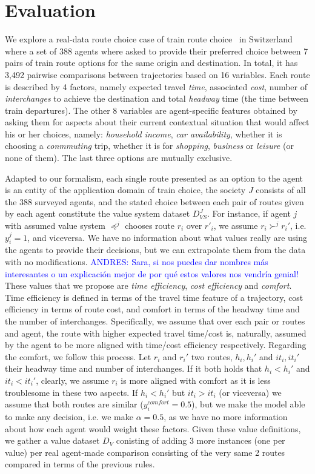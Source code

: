 \documentclass{ecai}
\begin{document}
\section{Evaluation}\label{sec:evaluation}
We explore a real-data route choice case of train route choice~\cite{apollochoicepublication} in Switzerland where a set of 388 agents where asked to provide their preferred choice between 7 pairs of train route options for the same origin and destination. In total, it has 3,492 pairwise comparisons between trajectories based on 16 variables. Each route is described by 4 factors, namely expected travel \textit{time}, associated \textit{cost}, number of \textit{interchanges} to achieve the destination and total \textit{headway} time (the time between train departures). The other 8 variables are agent-specific features obtained by asking them for aspects about their current contextual situation that would affect his or her choices, namely: \textit{household income}, \textit{car availability}, whether it is choosing a \textit{conmmuting} trip, whether it is for \textit{shopping}, \textit{business} or \textit{leisure} (or none of them). The last three options are mutually exclusive. 

Adapted to our formalism, each single route presented as an option to the agent is an entity of the application domain of train choice, the society $J$ consists of all the 388 surveyed agents, and the stated choice between each pair of routes given by each agent constitute the value system dataset $D_{VS}^J$. For instance, if agent $j$ with assumed value system $\preccurlyeq^j$ chooses route $r_i$ over $r'_i$, we assume $r_i \succ^j r_i'$, i.e. $y_i^j = 1$, and viceversa. We have no information about what values really are using the agents to provide their decisions, but we can extrapolate them from the data with no modifications. \textcolor{blue}{ANDRES: Sara, si nos puedes dar nombres más interesantes o un explicación mejor de por qué estos valores nos vendría genial!} These values that we propose are \textit{time efficiency}, \textit{cost efficiency} and \textit{comfort}. Time efficiency is defined in terms of the travel time feature of a trajectory, cost efficiency in terms of route cost, and comfort in terms of the headway time and the number of interchanges. Specifically, we assume that over each pair or routes and agent, the route with higher expected travel time/cost is, naturally, assumed by the agent to be more aligned with time/cost efficiency respectively. Regarding the comfort, we follow this process. Let $r_i$ and $r_i'$ two routes, $h_i,h_i'$ and $it_i,it_i'$ their headway time and number of interchanges. If it both holds that $h_i < h_i'$ and $it_i < it_i'$, clearly, we assume $r_i$ is more aligned with comfort as it is less troublesome in these two aspects. If $h_i < h_i'$ but $it_i > it_i$ (or viceversa) we assume that both routes are similar ($y_i^{comfort}=0.5$), but we make the model able to make any decision, i.e. we make $\alpha = 0.5$, as we have no more information about how each agent would weight these factors. Given these value definitions, we gather a value dataset $D_V$ conisting of adding 3 more instances (one per value) per real agent-made comparison consisting of the very same 2 routes compared in terms of the previous rules.
\end{document}
